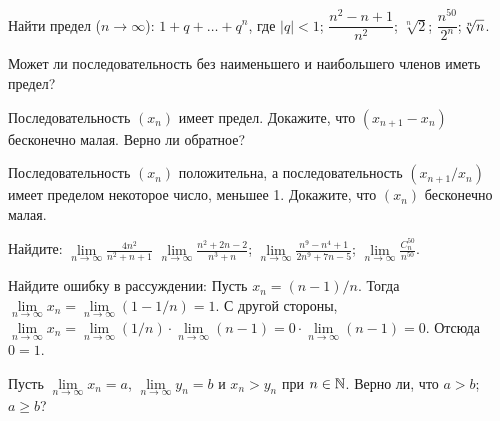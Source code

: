 \documentclass[a4paper, 12pt]{article}
\begin{document}
 Найти предел %
($n\! \to \!\infty$):
 $\!\!1+q+\ldots+q^{n}$, где $|q|<1$;
 $\!\!\dfrac{n^2-n+1}{n^2}$;
 $\!\!\sqrt[n]{2}$;
 $\!\!\dfrac{n^{50}}{2^n}$;
 $\!\!\root n \of n$.


Может ли последовательность без наименьшего и
наибольшего членов иметь предел?


 Последовательность
$(x_n)$ %
имеет предел.
Докажите, что %
$(x_{n+1}-x_n)$ бесконечно малая.
 Верно ли обратное?

 Последовательность $(x_n)$ положительна, а последовательность $(x_{n+1}/x_n)$ имеет пределом
некоторое число, меньшее 1. Докажите, что %
$(x_n)$ бесконечно малая.

 Найдите: %
 $\displaystyle{\lim\limits_{n \to \infty}\frac{4n^2}{n^2+n+1}}$
 $\displaystyle{\lim\limits_{n \to \infty}\frac{n^2+2n-2}{n^3+n}}$;
 $\displaystyle{\lim\limits_{n \to \infty}\frac{n^9-n^4+1}{2n^9+7n-5}}$;
 $\displaystyle{\lim\limits_{n \to \infty}\frac{C^{50}_n}{n^{50}}}$.

\vspace*{1mm}

 Найдите ошибку в рассуждении:
 Пусть $x_n=(n-1)/n$. Тогда
$\lim\limits_{n \to \infty} x_n =
\lim\limits_{n \to \infty}(1-1/n)=1$.\break
С другой стороны,
$\lim\limits_{n \to \infty} x_n =
\lim\limits_{n \to \infty}(1/n)\cdot\lim\limits_{n \to \infty}(n-1)
= 0\cdot\lim\limits_{n \to \infty} (n-1)= 0$.
Отсюда $0=1$.



Пусть $\lim\limits_{n \to \infty} x_n =a$, $\lim\limits_{n \to
\infty} y_n = b$ и $x_n>y_n$ при $n\in\mathbb{N}$.
Верно ли, что
 $a>b$;
 $a\geq b$?
\end{document}
